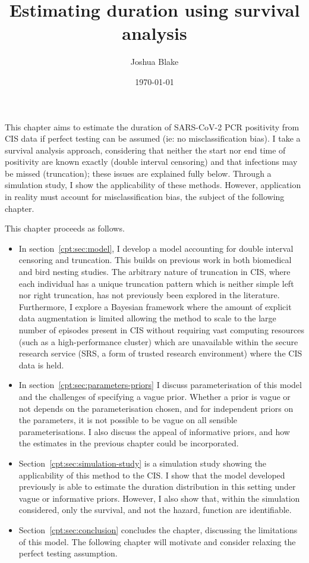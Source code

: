 \documentclass[main.tex]{subfiles}
\title{Estimating duration using survival analysis}
\author{Joshua Blake}
\date{\today}
\begin{document}
\maketitle

This chapter aims to estimate the duration of SARS-CoV-2 PCR positivity from CIS data if perfect testing can be assumed (ie: no misclassification bias).
I take a survival analysis approach, considering that neither the start nor end time of positivity are known exactly (double interval censoring) and that infections may be missed (truncation); these issues are explained fully below.
Through a simulation study, I show the applicability of these methods.
However, application in reality must account for misclassification bias, the subject of the following chapter.

This chapter proceeds as follows.
\begin{itemize}
\item  In section~\ref{cpt:sec:model}, I develop a model accounting for double interval censoring and truncation. This builds on previous work in both biomedical and bird nesting studies. The arbitrary nature of truncation in CIS, where each individual has a unique truncation pattern which is neither simple left nor right truncation, has not previously been explored in the literature. Furthermore, I explore a Bayesian framework where the amount of explicit data augmentation is limited allowing the method to scale to the large number of episodes present in CIS without requiring vast computing resources (such as a high-performance cluster) which are unavailable within the secure research service (SRS, a form of trusted research environment) where the CIS data is held.
\item  In section~\ref{cpt:sec:parameters-priors} I discuss parameterisation of this model and the challenges of specifying a vague prior. Whether a prior is vague or not depends on the parameterisation chosen, and for independent priors on the parameters, it is not possible to be vague on all sensible parameterisations. I also discuss the appeal of informative priors, and how the estimates in the previous chapter could be incorporated.
\item  Section~\ref{cpt:sec:simulation-study} is a simulation study showing the applicability of this method to the CIS. I show that the model developed previously is able to estimate the duration distribution in this setting under vague or informative priors. However, I also show that, within the simulation considered, only the survival, and not the hazard, function are identifiable.
\item  Section~\ref{cpt:sec:conclusion} concludes the chapter, discussing the limitations of this model. The following chapter will motivate and consider relaxing the perfect testing assumption.
\end{itemize}
\end{document}
